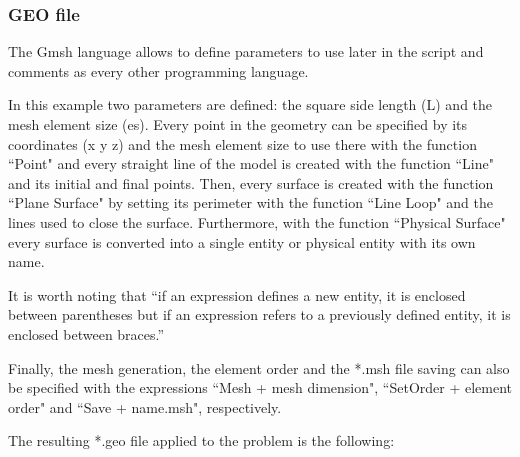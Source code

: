 \documentclass[a4]{article}
\begin{document}
\subsubsection{GEO file}

The Gmsh language allows to define parameters to use later in the script and comments as every other programming language. 

In this example two parameters are defined: the square side length (L) and the mesh element size (es). Every point in the geometry can be specified by its coordinates (x y z) and the mesh element size to use there with the function ``Point" and every straight line of the model is created with the function ``Line" and its initial and final points. Then, every surface is  created with the function ``Plane Surface" by setting its perimeter with the function ``Line Loop" and the lines used to close the surface. Furthermore, with the function ``Physical Surface" every surface is converted into a single entity or physical entity with its own name.  

It is worth noting that “if an expression defines a new entity, it is enclosed between parentheses but if an expression refers to a previously defined entity, it is enclosed between braces.” \cite{gmshweb}

Finally, the mesh generation, the element order and the *.msh file saving can also be specified with the expressions ``Mesh + mesh dimension", ``SetOrder + element order" and ``Save + name.msh", respectively.

The resulting *.geo file applied to the problem is the following:
\end{document}
